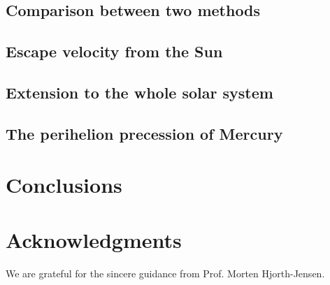 \documentclass{article}
\begin{document}
	\subsection{Comparison between two methods}
	

	\subsection{Escape velocity from the Sun}
	
	
	\subsection{Extension to the whole solar system}
	
	
	\subsection{The perihelion precession of Mercury}
	
	
\section{Conclusions}\label{conclude}

	
	\section*{Acknowledgments}
	We are grateful for the sincere guidance from Prof. Morten Hjorth-Jensen. 
	
	\nocite{*} 
	
	
\end{document}
